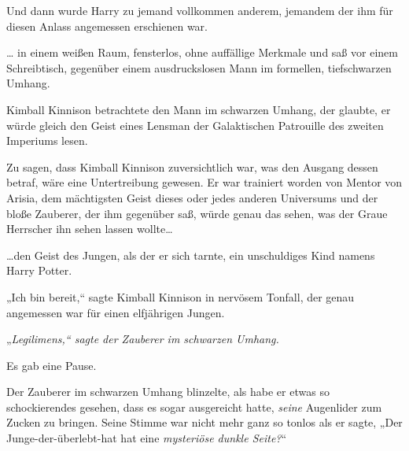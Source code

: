 Und dann wurde Harry zu jemand vollkommen anderem, jemandem der ihm für diesen Anlass angemessen erschienen war.

… in einem weißen Raum, fensterlos, ohne auffällige Merkmale und saß vor einem Schreibtisch, gegenüber einem ausdruckslosen Mann im formellen, tiefschwarzen Umhang.

Kimball Kinnison betrachtete den Mann im schwarzen Umhang, der glaubte, er würde gleich den Geist eines Lensman der Galaktischen Patrouille des zweiten Imperiums lesen.

Zu sagen, dass Kimball Kinnison zuversichtlich war, was den Ausgang dessen betraf, wäre eine Untertreibung gewesen. Er war trainiert worden von Mentor von Arisia, dem mächtigsten Geist dieses oder jedes anderen Universums und der bloße Zauberer, der ihm gegenüber saß, würde genau das sehen, was der Graue Herrscher ihn sehen lassen wollte…

…den Geist des Jungen, als der er sich tarnte, ein unschuldiges Kind namens Harry Potter.

„Ich bin bereit,“ sagte Kimball Kinnison in nervösem Tonfall, der genau angemessen war für einen elfjährigen Jungen.

„\emph{Legilimens,“ sagte der Zauberer im schwarzen Umhang.}

Es gab eine Pause.

Der Zauberer im schwarzen Umhang blinzelte, als habe er etwas so schockierendes gesehen, dass es sogar ausgereicht hatte, \emph{seine} Augenlider zum Zucken zu bringen. Seine Stimme war nicht mehr ganz so tonlos als er sagte, „Der Junge-der-überlebt-hat hat eine \emph{mysteriöse dunkle Seite?}“

